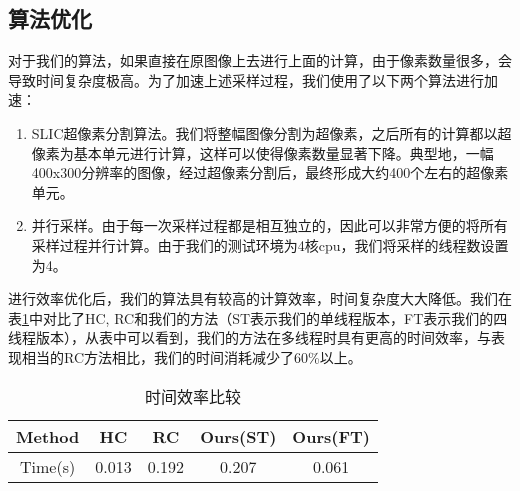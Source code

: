 \subsection{算法优化}
对于我们的算法，如果直接在原图像上去进行上面的计算，由于像素数量很多，会导致时间复杂度极高。为了加速上述采样过程，我们使用了以下两个算法进行加速：
\begin{enumerate}
\item SLIC超像素分割算法\cite{achanta2010slic}。我们将整幅图像分割为超像素，之后所有的计算都以超像素为基本单元进行计算，这样可以使得像素数量显著下降。典型地，一幅400x300分辨率的图像，经过超像素分割后，最终形成大约400个左右的超像素单元。
\item 并行采样。由于每一次采样过程都是相互独立的，因此可以非常方便的将所有采样过程并行计算。由于我们的测试环境为4核cpu，我们将采样的线程数设置为4。
\end{enumerate}

进行效率优化后，我们的算法具有较高的计算效率，时间复杂度大大降低。我们在表\ref{tab:eff}中对比了HC, RC和我们的方法（ST表示我们的单线程版本，FT表示我们的四线程版本），从表中可以看到，我们的方法在多线程时具有更高的时间效率，与表现相当的RC方法相比，我们的时间消耗减少了60\%以上。

\begin{table}
\centering
\vspace{0.06in}
\begin{tabular}{|c|c|c|c|c|}\hline
Method & HC   & RC   & Ours(ST) & Ours(FT)\\\hline
Time(s)& 0.013& 0.192& 0.207    & 0.061   \\\hline
\end{tabular}
\caption{时间效率比较}\label{tab:eff}
\end{table}